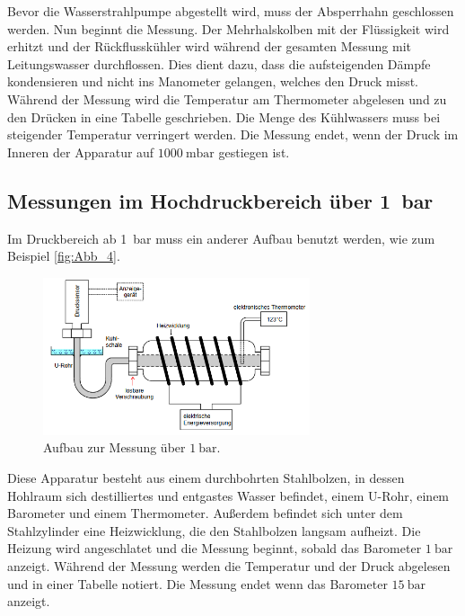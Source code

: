 Bevor die Wasserstrahlpumpe abgestellt wird, muss der Absperrhahn geschlossen werden.
Nun beginnt die Messung.
Der Mehrhalskolben mit der Flüssigkeit wird erhitzt und der Rückflusskühler wird während der gesamten Messung mit Leitungswasser durchflossen.
Dies dient dazu, dass die aufsteigenden Dämpfe kondensieren und nicht ins Manometer gelangen, welches den Druck misst.
Während der Messung wird die Temperatur am Thermometer abgelesen und zu den Drücken in eine Tabelle geschrieben.
Die Menge des Kühlwassers muss bei steigender Temperatur verringert werden.
Die Messung endet, wenn der Druck im Inneren der Apparatur auf $\qty{1000}{\milli\bar}$ gestiegen ist.

\subsection{Messungen im Hochdruckbereich über \qty{1}{\bar}} %
\label{sub:M_Hochdruckbereich}
Im Druckbereich ab \qty{1}{\bar} muss ein anderer Aufbau benutzt werden, wie zum Beispiel \autoref{fig:Abb_4}.
\begin{figure}[H]
    \centering
    \includegraphics[width=0.7\textwidth]{build/Abb_4.PNG}
    \caption {Aufbau zur Messung über $\qty{1}{\bar}$.\cite{v203}}
    \label{fig:Abb_4}
\end{figure}
Diese Apparatur besteht aus einem durchbohrten Stahlbolzen, in dessen Hohlraum sich destilliertes und entgastes Wasser befindet,
einem U-Rohr, einem Barometer und einem Thermometer.
Außerdem befindet sich unter dem Stahlzylinder eine Heizwicklung, die den Stahlbolzen langsam aufheizt.
Die Heizung wird angeschlatet und die Messung beginnt, sobald das Barometer $\qty{1}{\bar}$ anzeigt.
Während der Messung werden die Temperatur und der Druck abgelesen und in einer Tabelle notiert.
Die Messung endet wenn das Barometer $\qty{15}{\bar}$ anzeigt.
